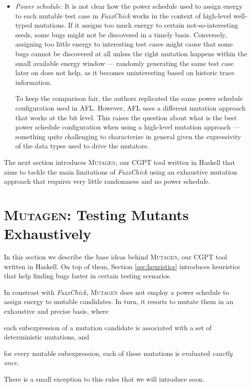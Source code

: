 \documentclass[acmsmall, anonymous]{acmart}
\newcommand{\fuzzchick}{\textit{FuzzChick}\xspace}
\newcommand{\mutagen}{\textsc{Mutagen}\xspace}
\begin{document}
\begin{itemize}
\item \emph{Power schedule:} It is not clear how the power schedule used to
  assign energy to each mutable test case in \fuzzchick works in the context of
  high-level well-typed mutations.
  If it assigns too much energy to certain not-so-interesting seeds, some bugs
  might not be discovered in a timely basis.
  Conversely, assigning too little energy to interesting test cases might cause
  that some bugs cannot be discovered at all unless the right mutation happens
  within the small available energy window --- randomly generating the same test
  case later on does not help, as it becomes uninteresting based on historic
  trace information.

  To keep the comparison fair, the authors replicated the same power schedule
  configuration used in AFL.
  However, AFL uses a different mutation approach that works at the bit level.
  This raises the question about what is the best power schedule configuration
  when using a high-level mutation approach --- something quite challenging to
  characterize in general given the expressivity of the data types used to
  drive the mutators.
\end{itemize}

The next section introduces \mutagen, our CGPT tool written in Haskell that aims
to tackle the main limitations of \fuzzchick using an exhaustive mutation
approach that requires very little randomness and no power schedule.


\section{\mutagen: Testing Mutants Exhaustively}
\label{sec:mutagen}

In this section we describe the base ideas behind \mutagen, our CGPT tool
written in Haskell.
%
On top of them, Section \ref{sec:heuristics} introduces heuristics that help
finding bugs faster in certain testing scenarios.

In constrast with \fuzzchick, \mutagen does not employ a power schedule to
assign energy to mutable candidates.
%
In turn, it resorts to mutate them in an exhaustive and precise basis, where
%
\begin{inparaenum}
  \item each subexpression of a mutation candidate is associated with a set of
    deterministic mutations, and
  \item for every mutable subexpression, each of these mutations is evaluated
    \emph{exactly once}.
\end{inparaenum}
%
There is a small exception to this rules that we will introduce soon.
\end{document}
